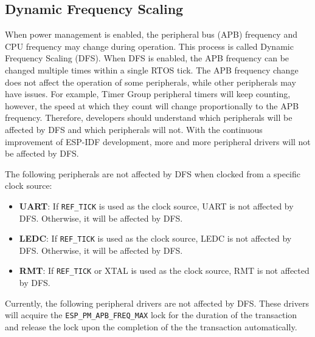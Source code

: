 \documentclass[a4paper,12pt,openany]{book}
\begin{document}
\subsection{Dynamic Frequency Scaling}
When power management is enabled, the peripheral bus (APB) frequency and CPU frequency may change during operation. This process is called Dynamic Frequency Scaling (DFS). When DFS is enabled, the APB frequency can be changed multiple times within a single RTOS tick. The APB frequency change does not affect the operation of some peripherals, while other peripherals may have issues. For example, Timer Group peripheral timers will keep counting, however, the speed at which they count will change proportionally to the APB frequency. Therefore, developers should understand which peripherals will be affected by DFS and which peripherals will not. With the continuous improvement of ESP-IDF development, more and more peripheral drivers will not be affected by DFS.

The following peripherals are not affected by DFS when clocked from a specific clock source:

\begin{itemize}
    \item \textbf{UART}: If \verb|REF_TICK| is used as the clock source, UART is not affected by DFS. Otherwise, it will be affected by DFS.
    \item \textbf{LEDC}: If \verb|REF_TICK| is used as the clock source, LEDC is not affected by DFS. Otherwise, it will be affected by DFS.
    \item \textbf{RMT}: If \verb|REF_TICK| or XTAL is used as the clock source, RMT is not affected by DFS.
\end{itemize}

Currently, the following peripheral drivers are not affected by DFS. These drivers will acquire the \verb|ESP_PM_APB_FREQ_MAX| lock for the duration of the transaction and release the lock upon the completion of the the transaction automatically.
\end{document}
